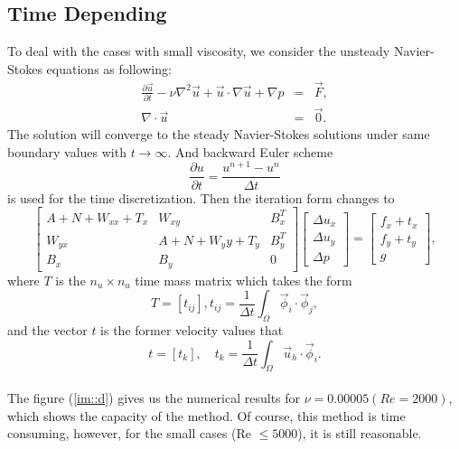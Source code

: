 \documentclass[a4paper]{article}
\begin{document}
\subsection{Time Depending}
To deal with the cases with small viscosity, we consider the unsteady Navier-Stokes equations as following:
\begin{equation}
\begin{array}{rcl}
\frac{\partial \vec{u}}{\partial t} - \nu \nabla^2 \vec{u} + \vec{u} \cdot \nabla \vec{u} + \nabla p & = & \vec{F}, \\
\nabla \cdot \vec{u} & = & \vec{0}.
\label{eq::Timedepending-problem}
\end{array}
\end{equation}
The solution will converge to the steady Navier-Stokes solutions under same boundary values with $t \to \infty$.
And backward Euler scheme
$$
\frac{\partial u}{\partial t} = \frac{u^{n + 1}-u^{n}}{\Delta t}
$$
is used for the time discretization. Then the iteration form changes to
\begin{equation}
\left[ \begin{array}{ccc}
A + N + W_{xx} + T_x & W_{xy} & B_x^T \\
W_{yx} & A + N + W{_yy} + T_y& B_y^T \\
B_x & B_y & 0
\end{array}
\right]
\left[\begin{array}{ccc}
\Delta u_x\\
\Delta u_y\\
\Delta p
\end{array}
\right] =
\left[\begin{array}{ccc}
f_x + t_x\\
f_y + t_y\\
g
\end{array}
\right],
\label{Timedepending}
\end{equation}
where $T$ is the $n_u\times n_u$ time mass matrix which takes the form
\begin{equation}
T = [t_{ij}], t_{ij}=\frac{1}{\Delta t} \int_{\Omega} \vec{\phi}_i
\cdot \vec{\phi}_j,
\end{equation}
and the vector $t$ is the former velocity values that
\begin{equation}
t = [t_{k}],\quad t_{k}=\frac{1}{\Delta t}\int_{\Omega}\vec{u}_h\cdot\vec{\phi}_i.
\end{equation}
\\


The figure (\ref{im::d}) gives us the numerical results for
$\nu=0.00005(Re=2000)$, which shows the capacity of the method. Of
course, this method is time consuming, however, for the small cases (Re
$\leq 5000$), it is still reasonable.
\end{document}

